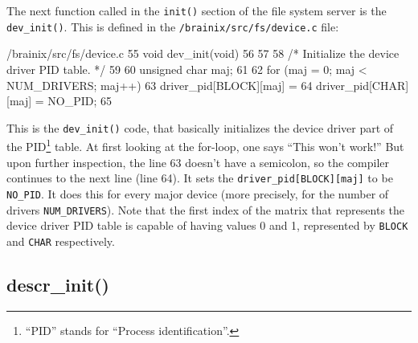 The next function called in the \verb|init()| section of the file system server is the \verb|dev_init()|. This is defined in the \verb|/brainix/src/fs/device.c| file:
\begin{code}{/brainix/src/fs/device.c}
55 void dev_init(void)
56 {
57 
58 /* Initialize the device driver PID table. */
59 
60      unsigned char maj;
61 
62      for (maj = 0; maj < NUM_DRIVERS; maj++) 
63           driver_pid[BLOCK][maj] = 
64           driver_pid[CHAR][maj] = NO_PID;
65 }
\end{code}
This is the \verb|dev_init()| code, that basically initializes the device driver part of the PID\footnote{``PID'' stands for ``Process identification''.} table. At first looking at the for-loop, one says ``This won't work!'' But upon further inspection, the line 63 doesn't have a semicolon, so the compiler continues to the next line (line 64). It sets the \verb|driver_pid[BLOCK][maj]| to be \verb|NO_PID|. It does this for every major device (more precisely, for the number of drivers \verb|NUM_DRIVERS|). Note that the first index of the matrix that represents the device driver PID table is capable of having values 0 and 1, represented by \verb|BLOCK| and \verb|CHAR| respectively. 

\subsection{descr\_init()}

